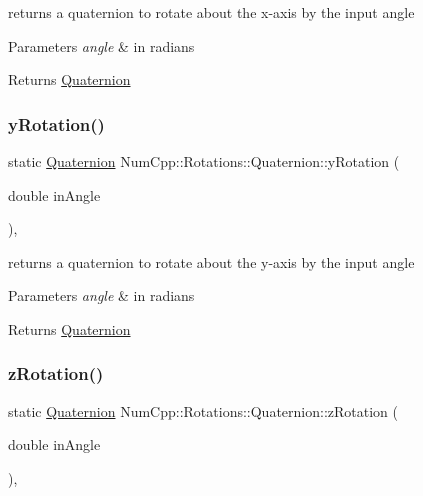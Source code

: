 returns a quaternion to rotate about the x-\/axis by the input angle


\begin{DoxyParams}{Parameters}
{\em angle} & in radians \\
\hline
\end{DoxyParams}
\begin{DoxyReturn}{Returns}
\mbox{\hyperlink{class_num_cpp_1_1_rotations_1_1_quaternion}{Quaternion}} 
\end{DoxyReturn}
\mbox{\label{class_num_cpp_1_1_rotations_1_1_quaternion_abcc4947abc9e0ca8dc2630940fad77df}} 
\subsubsection{\texorpdfstring{y\+Rotation()}{yRotation()}}
{\footnotesize\ttfamily static \mbox{\hyperlink{class_num_cpp_1_1_rotations_1_1_quaternion}{Quaternion}} Num\+Cpp\+::\+Rotations\+::\+Quaternion\+::y\+Rotation (\begin{DoxyParamCaption}\item[{double}]{in\+Angle }\end{DoxyParamCaption})\hspace{0.3cm}{\ttfamily [inline]}, {\ttfamily [static]}}

returns a quaternion to rotate about the y-\/axis by the input angle


\begin{DoxyParams}{Parameters}
{\em angle} & in radians \\
\hline
\end{DoxyParams}
\begin{DoxyReturn}{Returns}
\mbox{\hyperlink{class_num_cpp_1_1_rotations_1_1_quaternion}{Quaternion}} 
\end{DoxyReturn}
\mbox{\label{class_num_cpp_1_1_rotations_1_1_quaternion_a1c696741a9ad04719a17f0afced00e0f}} 
\subsubsection{\texorpdfstring{z\+Rotation()}{zRotation()}}
{\footnotesize\ttfamily static \mbox{\hyperlink{class_num_cpp_1_1_rotations_1_1_quaternion}{Quaternion}} Num\+Cpp\+::\+Rotations\+::\+Quaternion\+::z\+Rotation (\begin{DoxyParamCaption}\item[{double}]{in\+Angle }\end{DoxyParamCaption})\hspace{0.3cm}{\ttfamily [inline]}, {\ttfamily [static]}}

